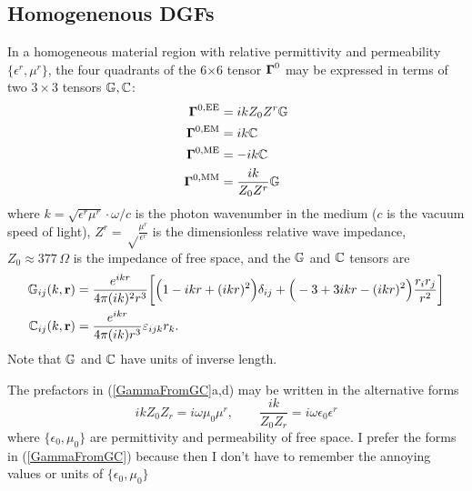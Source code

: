 \documentclass[letterpaper]{article}
\begin{document}
\subsection*{Homogenenous DGFs}

In a homogeneous material region with relative permittivity
and permeability $\{\epsilon^r, \mu^r\}$, the four quadrants of
the 6$\times$6 tensor $\boldsymbol{\Gamma}^0$ may be expressed in terms of
two $3\times 3$ tensors $\mathbb{G}, \mathbb{C}$:
\begin{subequations}
\begin{align}
 \boldsymbol{\Gamma}^{\text{\scriptsize 0,EE}} &= ikZ_0 Z^r \mathbb{G} \\
 \boldsymbol{\Gamma}^{\text{\scriptsize 0,EM}} &= ik        \mathbb{C} \\
 \boldsymbol{\Gamma}^{\text{\scriptsize 0,ME}} &= -ik       \mathbb{C} \\
 \boldsymbol{\Gamma}^{\text{\scriptsize 0,MM}} &= \frac{ik}{Z_0 Z^r} \mathbb{G}
\end{align}
\label{GammaFromGC}
\end{subequations}
where $k=\sqrt{\epsilon^r \mu^r}\cdot \omega/c$
is the photon wavenumber in the medium ($c$ is the vacuum speed 
of light),
$Z^r=\sqrt\frac{\mu^r}{\epsilon^r}$ is the dimensionless relative
wave impedance,
$Z_0\approx 377\,\Omega$ is the impedance of free space, and
the $\mathbb{G}$ and $\mathbb{C}$ tensors are
\begin{subequations}
\begin{align}
\mathbb{G}_{ij}(k,\mathbf{r}) 
 &= \frac{e^{ikr}}{4\pi (ik)^2 r^3}
    \bigg[ \Big(1-ikr + (ikr)^2 \Big)\delta_{ij}
          +\Big(-3 + 3ikr - (ikr)^2 \Big)\frac{r_i r_j}{r^2}
    \bigg]
\\
\mathbb{C}_{ij}(k,\mathbf{r}) 
 &= \frac{e^{ikr}}{4\pi (ik) r^3} \varepsilon_{ijk} r_k.
\end{align}
\label{GCDef}
\end{subequations}
Note that $\mathbb{G}$ and $\mathbb{C}$ have units of inverse length.

The prefactors in (\ref{GammaFromGC}a,d) may be written in the
alternative forms
$$ ikZ_0 Z_r = i\omega \mu_0 \mu^r, \qquad 
   \frac{ik}{Z_0 Z_r} = i\omega \epsilon_0 \epsilon^r
$$ 
where $\{\epsilon_0,\mu_0\}$ are permittivity and permeability of
free space. I prefer the forms in (\ref{GammaFromGC}) because
then I don't have to remember the annoying values or units of
$\{\epsilon_0, \mu_0\}$
\end{document}
